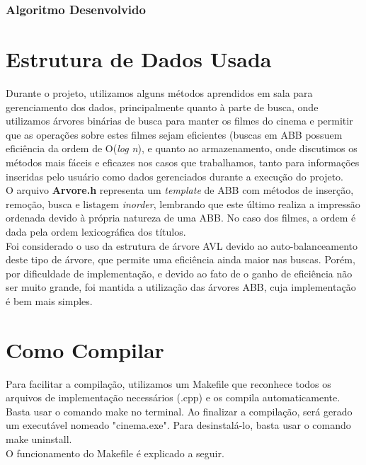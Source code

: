 \documentclass[a4paper]{article}
\begin{document}
\subsubsection{Algoritmo Desenvolvido}


\pagebreak

\section{Estrutura de Dados Usada}
\hspace{5 mm}Durante o projeto, utilizamos alguns métodos aprendidos em sala para gerenciamento dos dados, principalmente quanto à parte de busca, onde utilizamos árvores binárias de busca para manter os filmes do cinema e permitir que as operações sobre estes filmes sejam eficientes (buscas em ABB possuem eficiência da ordem de O(\textit{log n}), e quanto ao armazenamento, onde discutimos os métodos mais fáceis e eficazes nos casos que trabalhamos, tanto para informações inseridas pelo usuário como dados gerenciados durante a execução do projeto.\\


O arquivo \textbf{Arvore.h} representa um \textit{template} de ABB com métodos de inserção, remoção, busca e listagem \textit{inorder}, lembrando que este último realiza a impressão ordenada devido à própria natureza de uma ABB. No caso dos filmes, a ordem é dada pela ordem lexicográfica dos títulos.\\

Foi considerado o uso da estrutura de árvore AVL devido ao auto-balanceamento deste tipo de árvore, que permite uma eficiência ainda maior nas buscas. Porém, por dificuldade de implementação, e devido ao fato de o ganho de eficiência não ser muito grande, foi mantida a utilização das árvores ABB, cuja implementação é bem mais simples.
\pagebreak

\section{Como Compilar}
\hspace{5 mm}Para facilitar a compilação, utilizamos um Makefile que reconhece todos os arquivos de implementação necessários (.cpp) e os compila automaticamente. Basta usar o comando make no terminal. Ao finalizar a compilação, será gerado um executável nomeado "cinema.exe". Para desinstalá-lo, basta usar o comando make uninstall.\\
O funcionamento do Makefile é explicado a seguir.
\end{document}
